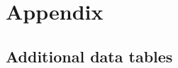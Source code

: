 \documentclass[final,3p,times,authoryear]{elsarticle}
\begin{document}

\begin{thebibliography}{00}


\bibitem[ ()]{}

\end{thebibliography}


\appendix
\setcounter{table}{0}
\renewcommand{\thetable}{A\arabic{table}}



\section{Appendix}\label{sec:app}  
\subsection{Additional data tables}\label{app:tables}  




%

\end{document}
